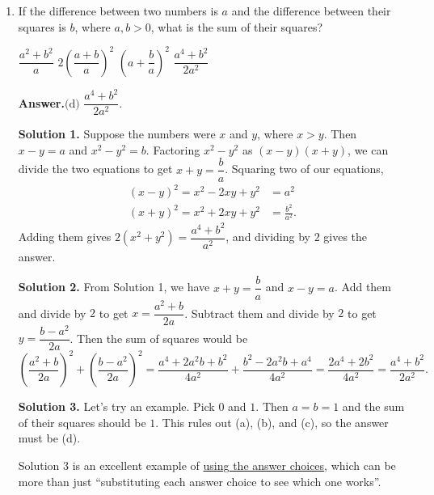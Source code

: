 \documentclass[11pt,paper=letter]{scrartcl}
\newcommand{\ans}{{\sffamily \bfseries Answer.}\;}
\newcommand{\ansb}[2]{\ans\(\boxed{\text{(#1) #2}}\).}
\newcommand{\soln}[1]{{\sffamily \bfseries Solution #1.}\;}
\newenvironment{rem}%
{\noindent \ignorespaces \small \sffamily \sansmath {\bfseries Remark.}}%
{\ignorespacesafterend}
\begin{document}
\begin{enumerate}[left=0pt]
\soln3 From the choices, we only need the signs of the coefficients relative to the sign of the $x^2$ term. Because the product of the roots is $1$, the constant should be positive. The sum of the roots is $\dfrac{r^2 + s^2}{rs}$. The numerator is a sum of squares, and is always positive; from the given polynomial, we see that $rs$ is also positive. So the sum is a positive number divided by a positive number, which is also positive. Hence the middle coefficient should be negative, and the only choice that matches is $3x^2 - 2x + 3$.

\item If the difference between two numbers is $a$ and the difference between their squares is $b$, where $a, b > 0$, what is the sum of their squares?

\fourch
{$\dfrac{a^2 + b^2}{a}$}
{$2\left(\dfrac{a + b}{a}\right)^2$}
{$\left(a + \dfrac{b}{a}\right)^2$}
{$\dfrac{a^4 + b^2}{2a^2}$}

\ansb{d}{$\dfrac{a^4 + b^2}{2a^2}$}

\soln1 Suppose the numbers were $x$ and $y$, where $x > y$. Then $x - y = a$ and $x^2 - y^2 = b$. Factoring $x^2 - y^2$ as $(x - y)(x + y)$, we can divide the two equations to get $x + y = \dfrac{b}{a}$. Squaring two of our equations,
\begin{align*}
(x - y)^2 = x^2 - 2xy + y^2 &= a^2 \\
(x + y)^2 = x^2 + 2xy + y^2 &= \frac{b^2}{a^2}.
\end{align*}
Adding them gives $2\left(x^2 + y^2\right) = \dfrac{a^4 + b^2}{a^2}$, and dividing by $2$ gives the answer.

\soln2 From Solution 1, we have $x + y = \dfrac{b}{a}$ and $x - y = a$. Add them and divide by $2$ to get $x = \dfrac{a^2 + b}{2a}$. Subtract them and divide by $2$ to get $y = \dfrac{b - a^2}{2a}$. Then the sum of squares would be \[
  \left(\frac{a^2 + b}{2a}\right)^2 + \left(\frac{b - a^2}{2a}\right)^2 = \frac{a^4 + 2a^2b + b^2}{4a^2} + \frac{b^2 - 2a^2b + a^4}{4a^2} = \frac{2a^4 + 2b^2}{4a^2} = \frac{a^4 + b^2}{2a^2}.
\]

\soln3 Let's try an example. Pick $0$ and $1$. Then $a = b = 1$ and the sum of their squares should be $1$. This rules out (a), (b), and (c), so the answer must be (d).

\begin{rem}
Solution 3 is an excellent example of \href{https://cjquines.com/files/engineering.pdf}{using the answer choices}, which can be more than just ``substituting each answer choice to see which one works''.
\end{rem}


\end{enumerate}
\end{document}
